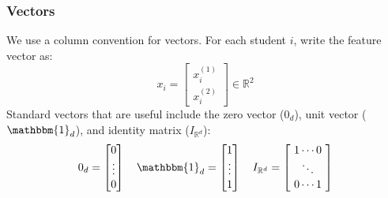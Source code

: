 \documentclass[12pt,oneside]{book}
\numberwithin{equation}{section}
\theoremstyle{definition}
\theoremstyle{plain}
\theoremstyle{remark}
\newcommand{\R}{\mathbb{R}}
\begin{document}
\subsubsection{Vectors}
We use a column convention for vectors. For each student $i$, write the feature vector as:
\[
x_i = 
\begin{bmatrix}
    x_i^{(1)} \\
    x_i^{(2)} 
\end{bmatrix}
\in \R^2
\]
Standard vectors that are useful include the zero vector ($0_d$), unit vector ($\mathbbm{1}_d$), and identity matrix ($I_{\R^d}$):
\[
0_d=
\begin{bmatrix}
    0 \\
    \vdots \\
    0
\end{bmatrix}
\quad
\mathbbm{1}_d=
\begin{bmatrix}
    1 \\
    \vdots \\
    1
\end{bmatrix}
\quad
I_{\R^d}=
\begin{bmatrix}
    1 \cdots 0 \\
    \quad \ddots \quad \\
    0 \cdots 1
\end{bmatrix}
\]
\end{document}
